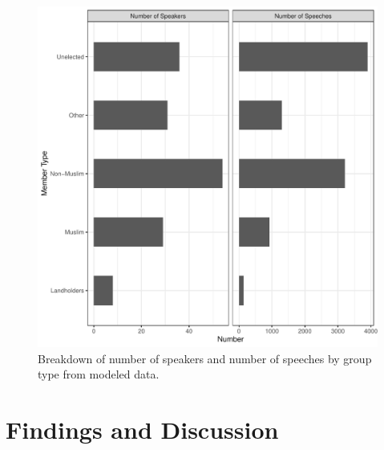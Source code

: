 \documentclass[12pt,letter]{article}
\begin{document}
\begin{figure}
    \centering
    \includegraphics[width=\linewidth]{../figs/speech-speaker-prop.pdf}
    \caption{Breakdown of number of speakers and number of speeches by group type from modeled data.}
    \label{fig:descrip_stats}
\end{figure}

\section{Findings and Discussion}
\end{document}
